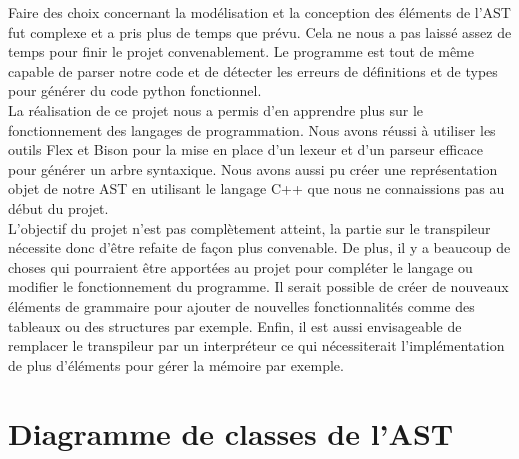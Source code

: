 \documentclass[a4paper]{article}%
\begin{document}
Faire des choix concernant la modélisation et la conception des éléments de
l'AST fut complexe et a pris plus de temps que prévu. Cela ne nous a pas laissé
assez de temps pour finir le projet convenablement. Le programme est tout de
même capable de parser notre code et de détecter les erreurs de définitions et
de types pour générer du code python fonctionnel.\\

La réalisation de ce projet nous a permis d'en apprendre plus sur le
fonctionnement des langages de programmation. Nous avons réussi à utiliser les
outils Flex et Bison pour la mise en place d'un lexeur et d'un parseur efficace
pour générer un arbre syntaxique. Nous avons aussi pu créer une représentation
objet de notre AST en utilisant le langage C++ que nous ne connaissions pas au
début du projet.\\

L'objectif du projet n'est pas complètement atteint, la partie sur le
transpileur nécessite donc d'être refaite de façon plus convenable. De plus, il
y a beaucoup de choses qui pourraient être apportées au projet pour compléter le
langage ou modifier le fonctionnement du programme. Il serait possible de créer
de nouveaux éléments de grammaire pour ajouter de nouvelles fonctionnalités
comme des tableaux ou des structures par exemple. Enfin, il est aussi
envisageable de remplacer le transpileur par un interpréteur ce qui
nécessiterait l'implémentation de plus d'éléments pour gérer la mémoire par
exemple.

\normalsize

\clearpage{}
\pagestyle{empty}
\printbibliography[keyword={paper},title={Biliographie}]
\printbibliography[keyword={web},title={Webographie}]

\clearpage
\printglossaries

\appendix

\clearpage{}
\section{Diagramme de classes de l'AST}\label{appendix:classAST}
\end{document}
